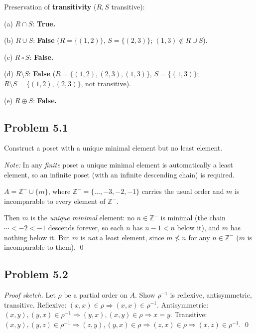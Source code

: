 Preservation of \textbf{transitivity} ($R,S$ transitive):

(a) $R\cap S$: \textbf{True.}

(b) $R\cup S$: \textbf{False} ($R=\{(1,2)\}$, $S=\{(2,3)\}$; $(1,3)\notin R\cup S$).

(c) $R\circ S$: \textbf{False.}

(d) $R\setminus S$: \textbf{False} ($R=\{(1,2),(2,3),(1,3)\}$, $S=\{(1,3)\}$; $R\setminus S=\{(1,2),(2,3)\}$, not transitive).

(e) $R\oplus S$: \textbf{False.}


\subsection*{Problem 5.1}

Construct a poset with a unique minimal element but no least element.

\emph{Note:} In any \emph{finite} poset a unique minimal element is automatically a least element, so an infinite poset (with an infinite descending chain) is required.

$\boxed{A=\mathbb{Z}^-\cup\{m\}}$, where $\mathbb{Z}^-=\{\ldots,-3,-2,-1\}$ carries the usual order and $m$ is incomparable to every element of $\mathbb{Z}^-$.

Then $m$ is the \emph{unique minimal} element: no $n\in\mathbb{Z}^-$ is minimal (the chain $\cdots<-2<-1$ descends forever, so each $n$ has $n-1<n$ below it), and $m$ has nothing below it. But $m$ is \emph{not} a least element, since $m\not\le n$ for any $n\in\mathbb{Z}^-$ ($m$ is incomparable to them). \qed


\subsection*{Problem 5.2}

\emph{Proof sketch.} Let $\rho$ be a partial order on $A$. Show $\rho^{-1}$ is reflexive, antisymmetric, transitive.
Reflexive: $(x,x)\in\rho\Rightarrow(x,x)\in\rho^{-1}$.
Antisymmetric: $(x,y),(y,x)\in\rho^{-1}\Rightarrow(y,x),(x,y)\in\rho\Rightarrow x=y$.
Transitive: $(x,y),(y,z)\in\rho^{-1}\Rightarrow(z,y),(y,x)\in\rho\Rightarrow(z,x)\in\rho\Rightarrow(x,z)\in\rho^{-1}$. \qed

